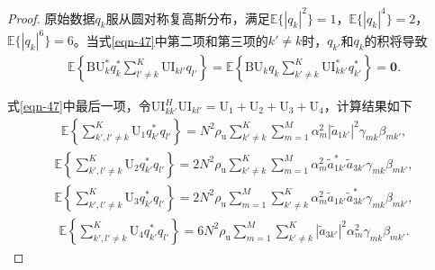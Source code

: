 \begin{proof}
原始数据$q_k$服从圆对称复高斯分布，满足$\mathbb{E} \{ \left | q_k \right |^2 \} =1$，$\mathbb{E}  \{ \left | q_k \right |^4  \} =2$，$\mathbb{E} \{ \left | q_k \right |^6 \} =6$。当式\eqref{eqn-47}中第二项和第三项的$k' \ne k$时，${q_{k'}}$和${q_k}$的积将导致
\begin{equation}\begin{aligned}\mathbb{E}\left\{ {\text{BU}_k^ * q_k^ * \sum _{l' \ne k}^K\text{UI}_{kl'}{q_{l'}}} \right\} = \mathbb{E}\left\{ {\text{BU}_k{q_k}\sum _{k' \ne k}^K\text{UI}_{kk'}^ * q_{k'}^ * } \right\} = \mathbf{0} .\end{aligned}\end{equation}

式\eqref{eqn-47}中最后一项，令$\text{UI}_{kk'}^H\text{UI}_{kl'} = {\text{U}_1} + {\text{U}_2} + {\text{U}_3} + {\text{U}_4}$，计算结果如下
\begin{equation}\begin{aligned}\label{eqn-54}\mathbb{E}\left\{ {\mathop \sum \limits_{k',l' \ne k}^K {\text{U}_1}q_{k'}^ * {q_{l'}}} \right\} = {N^2}{\rho _\text{u}}\mathop \sum \limits_{k' \ne k}^K \mathop \sum \limits_{m = 1}^M \alpha _m^2{\left| {{\tilde{a}_{1k'}}} \right|^2}{\gamma _{mk}}{\beta _{mk'}},\end{aligned}\end{equation}
\begin{equation}\begin{aligned}\mathbb{E}\left\{ {\mathop \sum \limits_{k',l' \ne k}^K {\text{U}_2}q_{k'}^ * {q_{l'}}} \right\} = 2{N^2}{\rho _\text{u}}\mathop \sum \limits_{k' \ne k}^K \mathop \sum \limits_{m = 1}^M \alpha _m^2\tilde{a}_{1k'}^ * {\tilde{a}_{3k'}}{\gamma _{mk}}{\beta _{mk'}},\end{aligned}\end{equation}
\begin{equation}\begin{aligned}\mathbb{E}\left\{ {\mathop \sum \limits_{k',l' \ne k}^K {\text{U}_3}q_{k'}^ * {q_{l'}}} \right\} = 2{N^2}{\rho _\text{u}}\mathop \sum \limits_{m = 1}^M \mathop \sum \limits_{k' \ne k}^K \alpha _m^2{\tilde{a}_{1k'}}\tilde{a}_{3k'}^ * {\gamma _{mk}}{\beta _{mk'}},\end{aligned}\end{equation}
\begin{equation}\begin{aligned}\label{eqn-57}\mathbb{E}\left\{ {\mathop \sum \limits_{k',l' \ne k}^K {\text{U}_4}q_{k'}^ * {q_{l'}}} \right\} = 6{N^2}{\rho _\text{u}}\mathop \sum \limits_{m = 1}^M \mathop \sum \limits_{k' \ne k}^K {\left| {{\tilde{a}_{3k'}}} \right|^2}\alpha _m^2{\gamma _{mk}}{\beta _{mk'}}.\end{aligned}\end{equation}


\end{proof}
